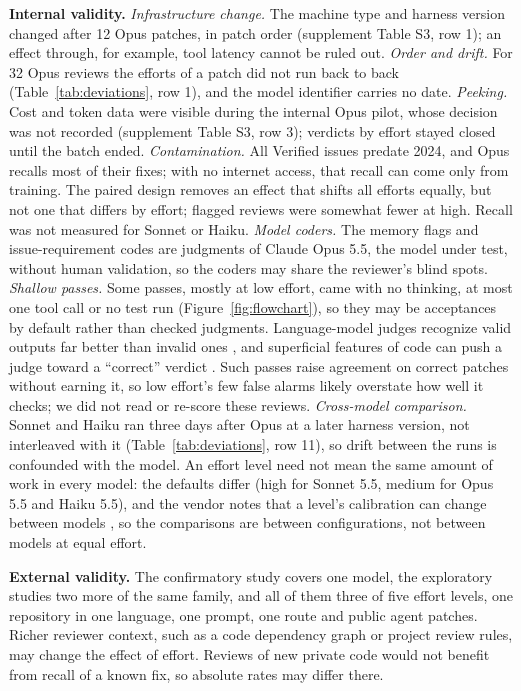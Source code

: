 \documentclass[sigconf,nonacm]{acmart}
\begin{document}
\textbf{Internal validity.} \textit{Infrastructure change.} The machine type and harness version changed after 12 Opus patches, in patch order (supplement Table S3, row 1); an effect through, for example, tool latency cannot be ruled out. \textit{Order and drift.} For 32 Opus reviews the efforts of a patch did not run back to back (Table~\ref{tab:deviations}, row 1), and the model identifier carries no date. \textit{Peeking.} Cost and token data were visible during the internal Opus pilot, whose decision was not recorded (supplement Table S3, row 3); verdicts by effort stayed closed until the batch ended. \textit{Contamination.} All Verified issues predate 2024, and Opus recalls most of their fixes; with no internet access, that recall can come only from training. The paired design removes an effect that shifts all efforts equally, but not one that differs by effort; flagged reviews were somewhat fewer at high. Recall was not measured for Sonnet or Haiku. \textit{Model coders.} The memory flags and issue-requirement codes are judgments of Claude Opus 5.5, the model under test, without human validation, so the coders may share the reviewer's blind spots. \textit{Shallow passes.} Some passes, mostly at low effort, came with no thinking, at most one tool call or no test run (Figure~\ref{fig:flowchart}), so they may be acceptances by default rather than checked judgments. Language-model judges recognize valid outputs far better than invalid ones \cite{jain2025agreeableness}, and superficial features of code can push a judge toward a ``correct'' verdict \cite{moon2026cover}. Such passes raise agreement on correct patches without earning it, so low effort's few false alarms likely overstate how well it checks; we did not read or re-score these reviews. \textit{Cross-model comparison.} Sonnet and Haiku ran three days after Opus at a later harness version, not interleaved with it (Table~\ref{tab:deviations}, row 11), so drift between the runs is confounded with the model. An effort level need not mean the same amount of work in every model: the defaults differ (high for Sonnet 5.5, medium for Opus 5.5 and Haiku 5.5), and the vendor notes that a level's calibration can change between models \cite{anthropic2026effort}, so the comparisons are between configurations, not between models at equal effort.

\textbf{External validity.} The confirmatory study covers one model, the exploratory studies two more of the same family, and all of them three of five effort levels, one repository in one language, one prompt, one route and public agent patches. Richer reviewer context, such as a code dependency graph or project review rules, may change the effect of effort. Reviews of new private code would not benefit from recall of a known fix, so absolute rates may differ there.
\end{document}
